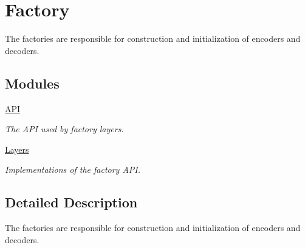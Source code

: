 \hypertarget{group__factory}{\section{Factory}
\label{group__factory}
}


The factories are responsible for construction and initialization of encoders and decoders.  


\subsection*{Modules}
\begin{DoxyCompactItemize}
\item 
\hyperlink{group__factory__api}{A\-P\-I}
\begin{DoxyCompactList}\small\item\em The A\-P\-I used by factory layers. \end{DoxyCompactList}\item 
\hyperlink{group__factory__layers}{Layers}
\begin{DoxyCompactList}\small\item\em Implementations of the factory A\-P\-I. \end{DoxyCompactList}\end{DoxyCompactItemize}


\subsection{Detailed Description}
The factories are responsible for construction and initialization of encoders and decoders. 
